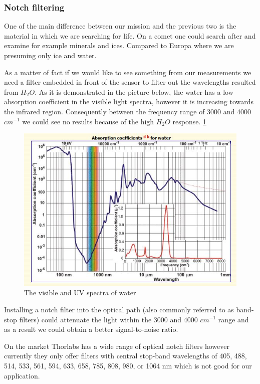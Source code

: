 \subsubsection{Notch filtering}

One of the main difference between our mission and the previous two is the material in which we are searching for life. On a comet one could search after and examine for example minerals and ices. Compared to Europa where we are presuming only ice and water.

As a matter of fact if we would like to see something from our measurements we need a filter embedded in front of the sensor to filter out the wavelengths resulted from $H_2O$. As it is demonstrated in the picture below, the water has a low absorption coefficient in the visible light spectra, however it is increasing towards the infrared region. Consequently between the frequency range of 3000 and 4000 $cm^{-1}$ we could see no results because of the high $H_2O$ response.
\ref{fig:Absorption_coeff_water}

\begin{figure}[htb]
  \centering
  \includegraphics[scale=0.7]{figures/BFfig/Absorption_coeff_water}
  \caption{The visible and UV spectra of water}
  \label{fig:Absorption_coeff_water}
\end{figure}

Installing a notch filter into the optical path (also commonly referred to as band-stop filters) could attenuate the light within the 3000 and 4000 $cm^{-1}$ range and as a result we could obtain a better signal-to-noise ratio.

On the market Thorlabs has a wide range of optical notch filters however currently they only offer filters with central stop-band wavelengths of 405, 488, 514, 533, 561, 594, 633, 658, 785, 808, 980, or 1064 nm which is not good for our application.
\cite{filters}

